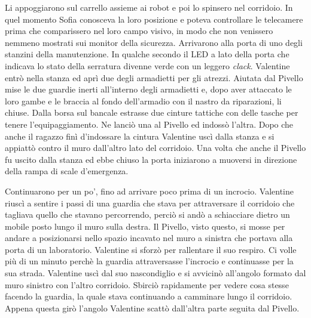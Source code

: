     Li appoggiarono sul carrello assieme ai robot e poi lo spinsero nel corridoio. In quel momento Sofia conosceva la
    loro posizione e poteva controllare le telecamere prima che comparissero nel loro campo visivo, in modo che non
    venissero nemmeno mostrati sui monitor della sicurezza. Arrivarono alla porta di uno degli stanzini della
    manutenzione. In qualche secondo il LED a lato della porta che indicava lo stato della serratura divenne verde con
    un leggero \emph{clack}. Valentine entrò nella stanza ed aprì due degli armadietti per gli atrezzi. Aiutata dal
    Pivello mise le due guardie inerti all'interno degli armadietti e, dopo aver attaccato le loro gambe e le braccia al
    fondo dell'armadio con il nastro da riparazioni, li chiuse. Dalla borsa sul bancale estrasse due cinture tattiche
    con delle tasche per tenere l'equipaggiamento. Ne lanciò una al Pivello ed indossò l'altra. Dopo che anche il
    ragazzo finì d'indossare la cintura Valentine uscì dalla stanza e si appiattò contro il muro dall'altro lato del
    corridoio. Una volta che anche il Pivello fu uscito dalla stanza ed ebbe chiuso la porta iniziarono a muoversi in
    direzione della rampa di scale d'emergenza.

    Continuarono per un po', fino ad arrivare poco prima di un incrocio. Valentine riuscì a sentire i passi di una
    guardia che stava per attraversare il corridoio che tagliava quello che stavano percorrendo, perciò si andò a
    schiacciare dietro un mobile posto lungo il muro sulla destra. Il Pivello, visto questo, si mosse per andare a
    posizionarsi nello spazio incavato nel muro a sinistra che portava alla porta di un laboratorio. Valentine si sforzò
    per rallentare il suo respiro. Ci volle più di un minuto perchè la guardia attraversasse l'incrocio e continuasse
    per la sua strada. Valentine uscì dal suo nascondiglio e si avvicinò all'angolo formato dal muro sinistro con
    l'altro corridoio. Sbirciò rapidamente per vedere cosa stesse facendo la guardia, la quale stava continuando a
    camminare lungo il corridoio. Appena questa girò l'angolo Valentine scattò dall'altra parte seguita dal Pivello.

